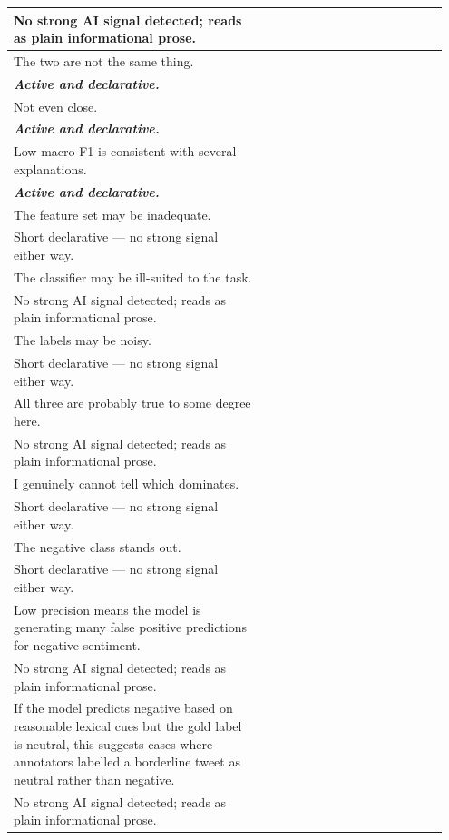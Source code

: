 \documentclass[11pt]{article}
\begin{document}
\begin{longtable}{|p{0.55\linewidth}|p{0.40\linewidth}|}
\hline
No strong AI signal detected; reads as plain informational prose. & \\
\hline
The two are not the same thing. & \\[2pt]
\hline
\textbf{\textit{Active and declarative.}}\vspace{2em} & \\
\hline
Not even close. & \\[2pt]
\hline
\textbf{\textit{Active and declarative.}}\vspace{2em} & \\
\hline
Low macro F1 is consistent with several explanations. & \\[2pt]
\hline
\textbf{\textit{Active and declarative.}}\vspace{2em} & \\
\hline
The feature set may be inadequate. & \\[2pt]
\hline
Short declarative --- no strong signal either way. & \\
\hline
The classifier may be ill-suited to the task. & \\[2pt]
\hline
No strong AI signal detected; reads as plain informational prose. & \\
\hline
The labels may be noisy. & \\[2pt]
\hline
Short declarative --- no strong signal either way. & \\
\hline
All three are probably true to some degree here. & \\[2pt]
\hline
No strong AI signal detected; reads as plain informational prose. & \\
\hline
I genuinely cannot tell which dominates. & \\[2pt]
\hline
Short declarative --- no strong signal either way. & \\
\hline
The negative class stands out. & \\[2pt]
\hline
Short declarative --- no strong signal either way. & \\
\hline
Low precision means the model is generating many false positive predictions for negative sentiment. & \\[2pt]
\hline
No strong AI signal detected; reads as plain informational prose. & \\
\hline
If the model predicts negative based on reasonable lexical cues but the gold label is neutral, this suggests cases where annotators labelled a borderline tweet as neutral rather than negative. & \\[2pt]
\hline
No strong AI signal detected; reads as plain informational prose. & \\

\end{longtable}
\end{document}

